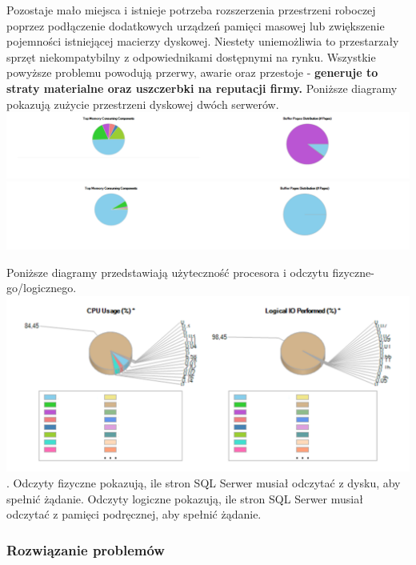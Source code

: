 \documentclass[a4paper, 12pt]{article}
\begin{document}
			 	\hspace*{1cm} Pozostaje mało miejsca i istnieje potrzeba rozszerzenia przestrzeni roboczej poprzez podłączenie dodatkowych urządzeń pamięci masowej lub zwiększenie pojemności istniejącej macierzy dyskowej. Niestety uniemożliwia to przestarzały sprzęt niekompatybilny z odpowiednikami dostępnymi na rynku.\newline
			\hspace*{1cm}  Wszystkie powyższe problemu powodują przerwy, awarie oraz  przestoje - \textbf{generuje to straty materialne oraz uszczerbki na reputacji firmy.}\newline
			Poniższe diagramy pokazują zużycie przestrzeni dyskowej dwóch serwerów.\newline
			\includegraphics[width=1.1\textwidth]{diagram_dyski_1}
			\includegraphics[width=1.1\textwidth]{diagram_dyski_2}
			
			Poniższe diagramy przedstawiają użyteczność procesora i odczytu fizyczne-go/logicznego.
			  \includegraphics[width=1.0\textwidth]{diagram}. \newline
			\hspace*{1cm} Odczyty fizyczne pokazują, ile stron SQL Serwer musiał odczytać z dysku, aby spełnić żądanie. Odczyty logiczne pokazują, ile stron SQL Serwer musiał odczytać z pamięci podręcznej, aby spełnić żądanie. 
			\subsubsection{Rozwiązanie problemów}
\end{document}
